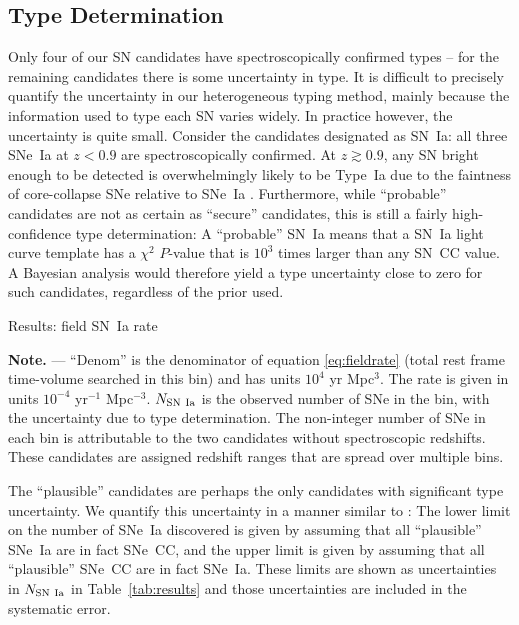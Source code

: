 \subsection{Type Determination} \label{sec:systyping}

Only four of our SN candidates have spectroscopically confirmed
types -- for the remaining candidates there is some uncertainty in
type. It is difficult to precisely quantify the uncertainty in our
heterogeneous typing method, mainly because the information
used to type each SN varies widely. In practice
however, the uncertainty is quite small. Consider the candidates
designated as SN~Ia: all three SNe~Ia at $z<0.9$ are spectroscopically
confirmed. At $z \gtrsim 0.9$, any SN bright enough to be detected is
overwhelmingly likely to be Type~Ia due to the faintness of
core-collapse SNe relative to SNe~Ia \citep[see, e.g.,][Meyers et al.,
submitted]{dahlen04a,li10a}. Furthermore, while ``probable''
candidates are not as certain as ``secure'' candidates, this is still
a fairly high-confidence type determination: A ``probable'' SN~Ia
means that a SN~Ia light curve template has a $\chi^2$ $P$-value that
is $10^3$ times larger than any SN~CC value. A Bayesian analysis would
therefore yield a type uncertainty close to zero for such candidates,
regardless of the prior used.


\begin{table}
\caption{\label{tab:results}Results: field SN~Ia rate}
\begin{center}

\end{center}
{\footnotesize {\bf Note.} --- ``Denom'' is the denominator of
equation \ref{eq:fieldrate} (total rest frame time-volume searched in
this bin) and has units $10^4$ yr Mpc$^3$. The rate is given in units
$10^{-4}$ yr$^{-1}$ Mpc$^{-3}$. $N_{\rm SN~Ia}$ is the observed number
of SNe in the bin, with the uncertainty due to type determination. The
non-integer number of SNe in each bin is attributable to the two
candidates without spectroscopic redshifts. These candidates are
assigned redshift ranges that are spread over multiple bins.}
\end{table}

The ``plausible'' candidates are perhaps the only candidates with
significant type uncertainty. We quantify this uncertainty in a manner
similar to \citet{dahlen08a}: The lower limit on the number of SNe~Ia
discovered is given by assuming that all ``plausible'' SNe~Ia are in
fact SNe~CC, and the upper limit is given by assuming that all
``plausible'' SNe~CC are in fact SNe~Ia.  These limits are shown as
uncertainties in $N_{\rm SN~Ia}$ in Table~\ref{tab:results} and
those uncertainties are included in the systematic error.

